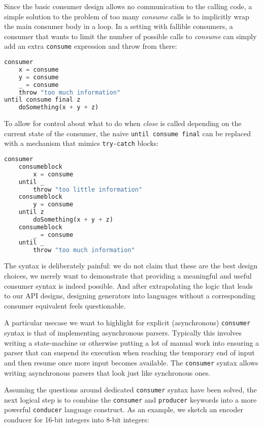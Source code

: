 \documentclass[sigplan,screen,10pt,anonymous,review]{acmart}
\begin{document}
Since the basic consumer design allows no communication to the calling code, a simple solution to the problem of too many \textit{consume} calls is to implicitly wrap the main consumer body in a loop. In a setting with fallible consumers, a consumer that wants to limit the number of possible calls to \textit{consume} can simply add an extra \texttt{consume} expression and throw from there:

\begin{lstlisting}[language=Python]
consumer
    x = consume
    y = consume
    _ = consume
    throw "too much information"
until consume final z
    doSomething(x + y + z)
\end{lstlisting}

To allow for control about what to do when \textit{close} is called depending on the current state of the consumer, the naive \texttt{until consume final} can be replaced with a mechanism that mimics \texttt{try-catch} blocks:

\begin{lstlisting}[language=Python]
consumer
    consumeblock
        x = consume
    until _
        throw "too little information"
    consumeblock
        y = consume
    until z
        doSomething(x + y + z)
    consumeblock
        _ = consume
    until _
        throw "too much information"
\end{lstlisting}

The syntax is deliberately painful: we do not claim that these are the best design choices, we merely want to demonstrate that providing a meaningful and useful consumer syntax is indeed possible. And after extrapolating the logic that leads to our API designs, designing generators into languages without a corresponding consumer equivalent feels questionable.

A particular usecase we want to highlight for explicit (asynchronous) \texttt{consumer} syntax is that of implementing asynchronous parsers. Typically this involves writing a state-machine or otherwise putting a lot of manual work into ensuring a parser that can suspend its execution when reaching the temporary end of input and then resume once more input becomes available. The \texttt{consumer} syntax allows writing asynchronous parsers that look just like synchronous ones.

Assuming the questions around dedicated \texttt{consumer} syntax have been solved, the next logical step is to combine the \texttt{consumer} and \texttt{producer} keywords into a more powerful \texttt{conducer} language construct. As an example, we sketch an encoder conducer for 16-bit integers into 8-bit integers:
\end{document}
